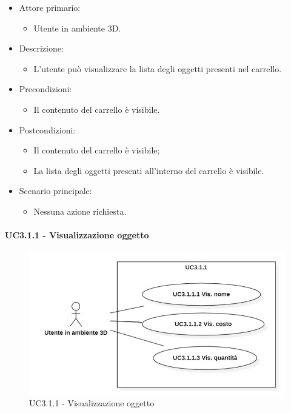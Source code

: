 \begin{itemize}
	
	\item Attore primario: 
	\begin{itemize}
		\item Utente in ambiente 3D.
	\end{itemize}
	\item Descrizione:
	\begin{itemize}
		\item L'utente può visualizzare la lista degli oggetti presenti nel carrello.
	\end{itemize}
	
	\item Precondizioni:
	\begin{itemize}
		\item Il contenuto del carrello è visibile.
	\end{itemize}
	
	\item Postcondizioni:
	\begin{itemize}
		\item Il contenuto del carrello è visibile;
		\item La lista degli oggetti presenti all'interno del carrello è visibile.
	\end{itemize}
	
	\item Scenario principale:
	\begin{itemize}
		\item Nessuna azione richiesta.
	\end{itemize}
	
\end{itemize}

\paragraph{UC3.1.1 - Visualizzazione oggetto}

\begin{figure}[H]
  \renewcommand{\thefigure}{3}
  \includegraphics[width=\linewidth]{./res/images/UC3.1.1.png}
  \caption{UC3.1.1 - Visualizzazione oggetto}
  \label{fig:UC 3.1.1}
\end{figure}

